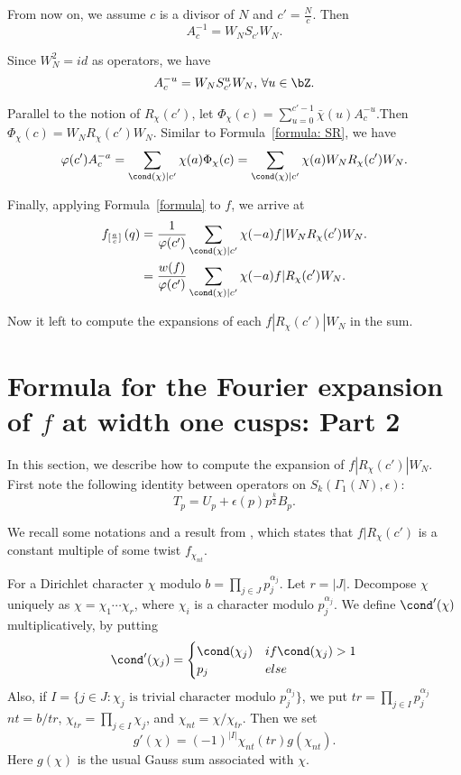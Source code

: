 \documentclass [11pt, proquest] {uwthesis}[2015/03/03]
\begin{document}
From now on, we assume $c$ is a divisor of $N$ and $c' = \frac{N}{c}$. Then
\[
	A_c^{-1} = W_N S_{c'} W_N.
\]

Since $W_N^2 = id$ as operators, we have
\[
	A_c^{-u} = W_N S_{c'}^u W_N, \, \forall u \in \bZ. 
\]

Parallel to the notion of $R_\chi(c')$, let $\Phi_\chi(c) = \sum_{u =0}^{c'-1} \bar{\chi}(u) A_c^{-u}$.Then $\Phi_\chi(c) = W_N R_\chi(c') W_N$. 
Similar to Formula~\ref{formula: SR}, we have
\begin{equation}
\label{formula}
	\varphi(c') A_c^{-a} = \sum_{\cond(\chi) \mid c'} \chi(a) \Phi_\chi(c) 
	 = \sum_{\cond(\chi) \mid c'} \chi(a) W_N R_\chi(c') W_N. 
\end{equation}

Finally, applying Formula~\ref{formula} to $f$, we arrive at
\begin{eqnarray}
	f_{[\frac{a}{c}]} \left( q\right) &= \frac{1}{\varphi(c')}\sum_{\cond(\chi) \mid c'} \chi(-a) f| W_N R_\chi(c') W_N. \\ 
	&= \frac{w(f) }{\varphi(c')}\sum_{\cond(\chi) \mid c'} \chi(-a) f| R_\chi(c')  W_N. 
\end{eqnarray}

Now it left to compute the expansions of  each $f| R_\chi(c') | W_N$ in the sum.

\section{Formula for the Fourier expansion of $f$ at width one cusps: Part 2}

In this section, we describe how to compute the expansion of $f| R_\chi(c') | W_N$. First note the following identity between operators on $S_k(\Gamma_1(N), \epsilon)$: $$T_p = U_p  + \epsilon(p) p^{\frac{k}{2}}B_p.$$

We recall some notations and a result from \cite{delaunay2002thesis}, which states that $f | R_\chi(c')$ is a constant multiple of some twist $f_{\chi_{nt}}$. 
\begin{Definition}\cite[Definition III.2.4]{delaunay2002thesis}
For a Dirichlet character $\chi$ modulo $b = \prod_{j \in J} p_j^{\alpha_j}$. Let $r = |J|$. Decompose $\chi$ uniquely as 
$\chi = \chi_1 \cdots \chi_r$, where $\chi_i$ is a character modulo $p_j^{\alpha_j}$.  We define $\cond'(\chi)$ multiplicatively, by putting 
\[
	\cond'(\chi_j) = \begin{cases} \cond(\chi_j) & if \cond(\chi_j) > 1 \\ p_j & else \end{cases}
\]
Also, if $I = \{j \in J : \chi_j \mbox{ is trivial character modulo } p_j^{\alpha_j}\}$, we put $tr = \prod_{j \in I} p_j^{\alpha_j} $
$nt = b/tr$,  $\chi_{tr} = \prod_{j \in I} \chi_j$, and $\chi_{nt} = \chi/\chi_{tr}$. Then we set
\[
	g'(\chi) = (-1)^{|I|} \chi_{nt}(tr) g(\chi_{nt}). 
\]
Here $g(\chi)$ is the usual Gauss sum associated with $\chi$.
\end{Definition}
\end{document}
